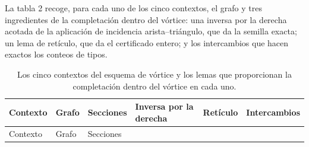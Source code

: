 \documentclass[spanish,11pt,a4paper]{article}
\begin{document}
La tabla 2 recoge, para cada uno de los cinco contextos, el grafo y tres ingredientes de la completación dentro del vórtice: una inversa por la derecha acotada de la aplicación de incidencia arista--triángulo, que da la semilla exacta; un lema de retículo, que da el certificado entero; y los intercambios que hacen exactos los conteos de tipos.

\begin{longtable}[]{@{}
  >{\raggedright\arraybackslash}p{}
  >{\raggedright\arraybackslash}p{}
  >{\raggedright\arraybackslash}p{}
  >{\raggedright\arraybackslash}p{}
  >{\raggedright\arraybackslash}p{}
  >{\raggedright\arraybackslash}p{}@{}}
\caption{Los cinco contextos del esquema de vórtice y los lemas que proporcionan la completación dentro del vórtice en cada uno.}\tabularnewline
\toprule\noalign{}
\begin{minipage}[b]{\linewidth}\raggedright
Contexto
\end{minipage} & \begin{minipage}[b]{\linewidth}\raggedright
Grafo
\end{minipage} & \begin{minipage}[b]{\linewidth}\raggedright
Secciones
\end{minipage} & \begin{minipage}[b]{\linewidth}\raggedright
Inversa por la derecha
\end{minipage} & \begin{minipage}[b]{\linewidth}\raggedright
Retículo
\end{minipage} & \begin{minipage}[b]{\linewidth}\raggedright
Intercambios
\end{minipage} \\
\midrule\noalign{}
\endfirsthead
\toprule\noalign{}
\begin{minipage}[b]{\linewidth}\raggedright
Contexto
\end{minipage} & \begin{minipage}[b]{\linewidth}\raggedright
Grafo
\end{minipage} & \begin{minipage}[b]{\linewidth}\raggedright
Secciones
\end{minipage} & \begin{minipage}[b]{\linewidth}\raggedright

\end{minipage}
\end{longtable}
\end{document}
